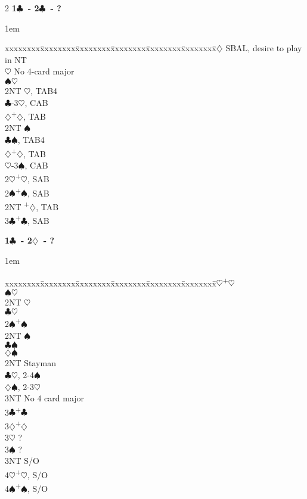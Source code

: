 \documentclass[10pt]{article}
\renewcommand{\c}{$\clubsuit$}
\renewcommand{\d}{$\diamondsuit$}
\newcommand{\h}{$\heartsuit$}
\newcommand{\s}{$\spadesuit$}
\newcommand{\p}{\textsuperscript{+}}
\newenvironment{bidtable}[1][]
{\textbf{#1}
  \begin{adjustwidth}{1em}{}
    \addvspace{2pt}
    \begin{tabbing}
      xxxxxxxx\=xxxxxxxx\=xxxxxxxx\=xxxxxxxx\=xxxxxxxx\=xxxxxxxx\=\kill}
{\end{tabbing}\end{adjustwidth}\bigskip}%
\begin{document}
\begin{multicols*}{2}
\begin{bidtable}[1\c\ - 2\c\ - ?]
2\d \> SBAL, desire to play in NT \\
    \h \> No 4-card major     \\
    \s {}\h                 \\
    \>     \> 2NT \h, TAB4    \\
    \>     \c {}-3\h, CAB   \\
    \>     \d {}\p\d, TAB   \\
    \> 2NT \s                 \\
    \>     \c {}\s, TAB4    \\
    \>     \d {}\p\d, TAB   \\
    \>     \h {}-3\s, CAB   \\
2\h {}\p\h, SAB                 \\
2\s {}\p\s, SAB                 \\
2NT \p\d, TAB                 \\
3\c {}\p\c, SAB
\end{bidtable}

\begin{bidtable}[1\c\ - 2\d\ - ?]
2\h {}\p\h                  \\
    \s {}\h             \\
    \> 2NT \h             \\
    \c {}\h             \\
2\s {}\p\s                  \\
    \> 2NT \s             \\
    \c {}\s             \\
    \d {}\s             \\
2NT \> Stayman                \\
    \c {}\h, 2-4\s      \\
    \d {}\s, 2-3\h      \\
    \> 3NT \> No 4 card major \\
3\c {}\p\c                  \\
3\d {}\p\d                  \\
3\h \> ?                      \\
3\s \> ?                      \\
3NT \> S/O                    \\
4\h {}\p\h, S/O             \\
4\s {}\p\s, S/O
\end{bidtable}


\end{multicols*}
\end{document}
